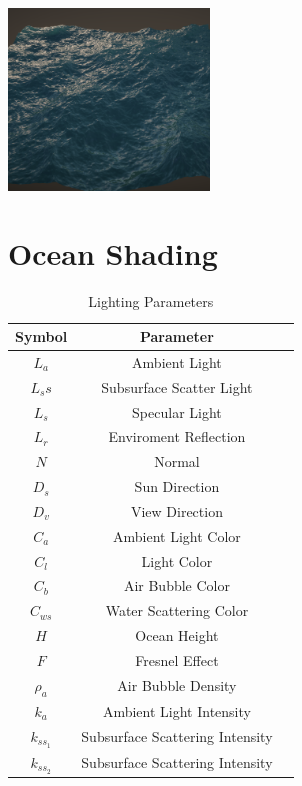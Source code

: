 \begin{minipage}{1\textwidth}
    \centering
    \includegraphics[width=0.40\textwidth]{"images/rendered_height_choppy.png"}
    \label{fig:ocean_choppy}
\end{minipage}

\section{Ocean Shading}

\begin{table}[H]
    \centering
    \begin{tabular}{|c|c|c|}
        \hline
        \textbf{Symbol} & \textbf{Parameter} \\
        \hline
        $L_a$ & Ambient Light \\
        $L_ss$ & Subsurface Scatter Light\\
        $L_s$ & Specular Light\\
        $L_r$ & Enviroment Reflection\\
        $N$ & Normal \\
        $D_s$ & Sun Direction \\
        $D_v$ & View Direction \\
        $C_a$ & Ambient Light Color \\
        $C_l$ & Light Color \\
        $C_b$ & Air Bubble Color \\
        $C_{ws}$ & Water Scattering Color \\
        $H$ & Ocean Height \\
        $F$ & Fresnel Effect \\
        $\rho_a$ & Air Bubble Density \\
        $k_a$ & Ambient Light Intensity \\
        $k_{ss_1}$ & Subsurface Scattering Intensity \\
        $k_{ss_2}$ & Subsurface Scattering Intensity \\
        \hline
    \end{tabular}
    \caption{Lighting Parameters}
    \label{table:lighting_parameters}
\end{table}

